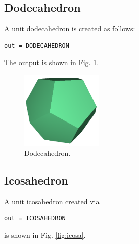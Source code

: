 \noindent


\subsection{Dodecahedron}

A unit dodecahedron is created as follows:\\

\begin{bbox}
\begin{verbatim}
out = DODECAHEDRON
\end{verbatim}
\end{bbox}
\vspace{6mm}

\noindent
The output is shown in Fig. \ref{fig:dodeca}.
\newpage

\begin{figure}[!ht]
\begin{center}
\includegraphics[width=0.35\textwidth]{img/dodeca-2.png}
\end{center}
\vspace{-4mm}
\caption{Dodecahedron.}
\label{fig:dodeca}
\end{figure}

\subsection{Icosahedron}

A unit icosahedron created via\\

\begin{bbox}
\begin{verbatim}
out = ICOSAHEDRON
\end{verbatim}
\end{bbox}
\vspace{6mm}

\noindent
is shown in Fig. \ref{fig:icosa}.

